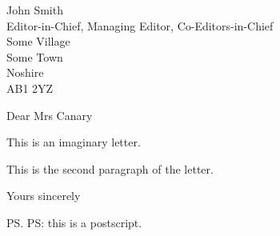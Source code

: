 \documentclass[12pt]{letter}
\def\EditorName{John Smith}
\def\EditorTitle{Editor-in-Chief, Managing Editor, Co-Editors-in-Chief}
\begin{document}
\begin{letter}{\EditorName \\ \EditorTitle \\
Some Village\\Some Town\\Noshire\\AB1 2YZ}

  \opening{Dear Mrs Canary}

  This is an imaginary letter.

  This is the second paragraph of the letter.

  \closing{Yours sincerely}

  \ps PS: this is a postscript.


\end{letter}
\end{document}
